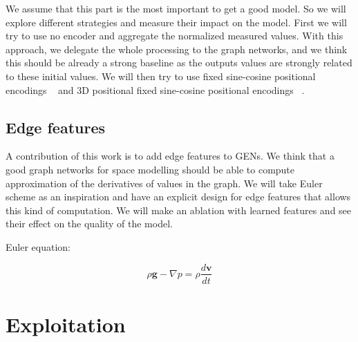 \documentclass[a4paper,10pt]{article}
\newcommand{\ap}[1]{\marginpar{{\tiny \color{red} [AP] #1}}}
\begin{document}
We assume that this part is the most important to get a good model. So we will explore different strategies and measure their impact on the model. First we will try to use no encoder and aggregate the normalized measured values. With this approach, we delegate the whole processing to the graph networks, and we think this should be already a strong baseline as the outputs values are strongly related to these initial values. We will then try to use fixed sine-cosine positional encodings ~\cite{vaswani2017attention} and 3D positional fixed sine-cosine positional encodings ~\cite{chu2021conditional}.

\subsection{Edge features}
A contribution of this work is to add edge features to GENs. We think that a good graph networks for space modelling should be able to compute approximation of the derivatives of values in the graph. We will take Euler scheme as an inspiration and have an explicit design for edge features that allows this kind of computation. We will make an ablation with learned features and see their effect on the quality of the model.
\ap{TODO: sketch}


Euler equation:

\begin{equation}
  \rho \mathbf{g} - \nabla p = \rho\frac{d\mathbf{v}}{dt}
\end{equation}


\section{Exploitation}

\end{document}
